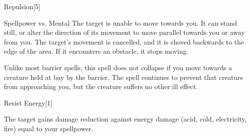 \begin{spellsection}{Repulsion}[5]
    \begin{spellheader}
    \end{spellheader}
    \begin{spellcontent}
        \begin{spelltargetinginfo}
        \end{spelltargetinginfo}
        \begin{spelleffects}
            \begin{spellattack}{Spellpower vs. Mental}
                \spellsuccess The target is unable to move towards you. It can stand still, or alter the direction of its movement to move parallel towards you or away from you.
                \spellcritical The target's movement is cancelled, and it is shoved backwards to the edge of the area.
                If it encounters an obstacle, it stops moving.
            \end{spellattack}
            \spelldur \durshort \dismissable
        \end{spelleffects}
    \end{spellcontent}
    \begin{spellfooter}
        \spellnotes Unlike most barrier spells, this spell does not collapse if you move towards a creature held at bay by the barrier. The spell continues to prevent that creature from approaching you, but the creature suffers no other ill effect.
        \miscastexplode
    \end{spellfooter}
\end{spellsection}

\begin{spellsection}{Resist Energy}[1]
    \begin{spellheader}
    \end{spellheader}
    \begin{spellcontent}
        \begin{spelltargetinginfo}
        \end{spelltargetinginfo}
        \begin{spelleffects}
            \spelleffect The target gains damage reduction against energy damage (acid, cold, electricity, fire) equal to your spellpower.
            \spelldur \durshort
        \end{spelleffects}
    \end{spellcontent}
    \begin{spellfooter}
        \miscastexplode
    \end{spellfooter}
\end{spellsection}

